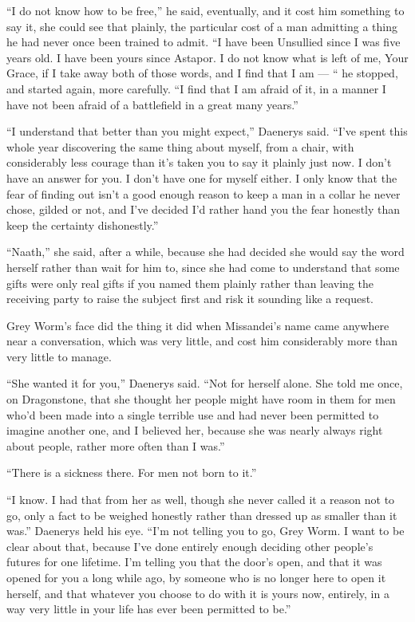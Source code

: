 “I do not know how to be free,” he said, eventually, and it cost him something to say it, she could see that plainly, the particular cost of a man admitting a thing he had never once been trained to admit. “I have been Unsullied since I was five years old. I have been yours since Astapor. I do not know what is left of me, Your Grace, if I take away both of those words, and I find that I am — “ he stopped, and started again, more carefully. “I find that I am afraid of it, in a manner I have not been afraid of a battlefield in a great many years.”

“I understand that better than you might expect,” Daenerys said. “I’ve spent this whole year discovering the same thing about myself, from a chair, with considerably less courage than it’s taken you to say it plainly just now. I don’t have an answer for you. I don’t have one for myself either. I only know that the fear of finding out isn’t a good enough reason to keep a man in a collar he never chose, gilded or not, and I’ve decided I’d rather hand you the fear honestly than keep the certainty dishonestly.”

\sceneBreak

“Naath,” she said, after a while, because she had decided she would say the word herself rather than wait for him to, since she had come to understand that some gifts were only real gifts if you named them plainly rather than leaving the receiving party to raise the subject first and risk it sounding like a request.

Grey Worm’s face did the thing it did when Missandei’s name came anywhere near a conversation, which was very little, and cost him considerably more than very little to manage.

“She wanted it for you,” Daenerys said. “Not for herself alone. She told me once, on Dragonstone, that she thought her people might have room in them for men who’d been made into a single terrible use and had never been permitted to imagine another one, and I believed her, because she was nearly always right about people, rather more often than I was.”

“There is a sickness there. For men not born to it.”

“I know. I had that from her as well, though she never called it a reason not to go, only a fact to be weighed honestly rather than dressed up as smaller than it was.” Daenerys held his eye. “I’m not telling you to go, Grey Worm. I want to be clear about that, because I’ve done entirely enough deciding other people’s futures for one lifetime. I’m telling you that the door’s open, and that it was opened for you a long while ago, by someone who is no longer here to open it herself, and that whatever you choose to do with it is yours now, entirely, in a way very little in your life has ever been permitted to be.”

